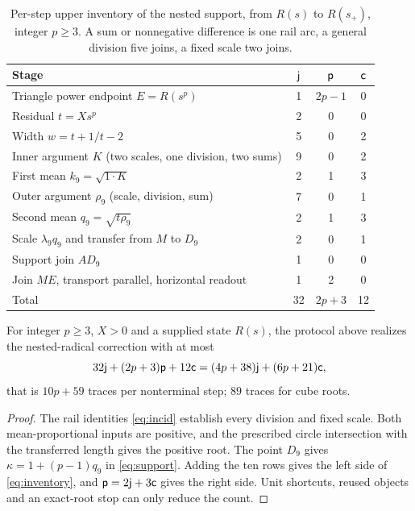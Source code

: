 \begin{table}[h]
\centering\small
\caption{Per-step upper inventory of the nested support, from $R(s)$ to $R(s_+)$, integer $p\ge3$.
A sum or nonnegative difference is one rail arc, a general division five joins, a fixed scale two
joins.}\label{tab:inventory}
\begin{tabular}{@{}lccc@{}}
\toprule
Stage & $\mathsf{j}$ & $\mathsf{p}$ & $\mathsf{c}$\\
\midrule
Triangle power endpoint $E=R(s^{p})$ & 1 & $2p-1$ & 0\\
Residual $t=Xs^{p}$ & 2 & 0 & 0\\
Width $w=t+1/t-2$ & 5 & 0 & 2\\
Inner argument $K$ (two scales, one division, two sums) & 9 & 0 & 2\\
First mean $k_9=\sqrt{1\cdot K}$ & 2 & 1 & 3\\
Outer argument $\rho_9$ (scale, division, sum) & 7 & 0 & 1\\
Second mean $q_9=\sqrt{t\rho_9}$ & 2 & 1 & 3\\
Scale $\lambda_9q_9$ and transfer from $M$ to $D_9$ & 2 & 0 & 1\\
Support join $AD_9$ & 1 & 0 & 0\\
Join $ME$, transport parallel, horizontal readout & 1 & 2 & 0\\
\midrule
Total & 32 & $2p+3$ & 12\\
\bottomrule
\end{tabular}
\end{table}

\begin{proposition}\label{prop:inventory}
For integer $p\ge3$, $X>0$ and a supplied state $R(s)$, the protocol above realizes the nested-radical
correction with at most
\begin{equation}\label{eq:inventory}
32\mathsf{j}+(2p+3)\mathsf{p}+12\mathsf{c}=(4p+38)\mathsf{j}+(6p+21)\mathsf{c},
\end{equation}
that is $10p+59$ traces per nonterminal step; $89$ traces for cube roots.
\end{proposition}
\begin{proof}
The rail identities \eqref{eq:incid} establish every division and fixed scale. Both mean-proportional
inputs are positive, and the prescribed circle intersection with the transferred length gives the
positive root. The point $D_9$ gives $\kappa=1+(p-1)q_9$ in \eqref{eq:support}. Adding the ten rows
gives the left side of \eqref{eq:inventory}, and $\mathsf{p}=2\mathsf{j}+3\mathsf{c}$ gives the right side. Unit shortcuts,
reused objects and an exact-root stop can only reduce the count.
\end{proof}


